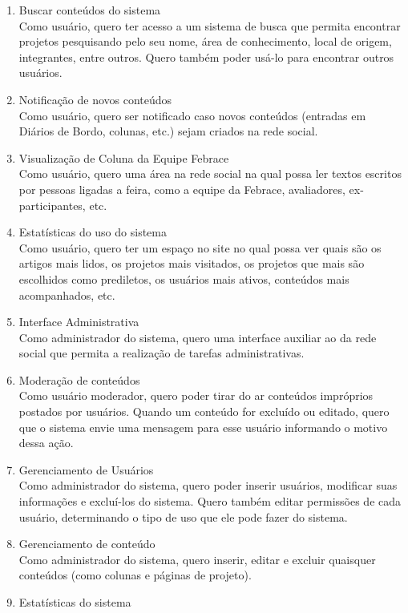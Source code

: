 \begin{enumerate}
      \item Buscar conteúdos do sistema \\
        Como usuário, quero ter acesso a  um sistema de busca que permita encontrar projetos pesquisando pelo seu nome, área de conhecimento, local de origem, integrantes, entre outros. Quero também poder usá-lo para encontrar outros usuários.
      \item Notificação de novos conteúdos \\
        Como usuário, quero ser notificado caso novos conteúdos (entradas em Diários de Bordo, colunas, etc.) sejam criados na rede social.
      \item Visualização de Coluna da Equipe Febrace \\
        Como usuário, quero uma área na rede social na qual possa ler textos escritos por pessoas ligadas a feira, como a equipe da Febrace, avaliadores, ex-participantes, etc.
      \item Estatísticas do uso do sistema \\
        Como usuário, quero ter um espaço no site no qual possa ver quais são os artigos mais lidos, os projetos mais visitados, os projetos que mais são escolhidos como prediletos, os usuários mais ativos, conteúdos mais acompanhados, etc.
      \item Interface Administrativa \\
        Como administrador do sistema, quero uma interface auxiliar ao da rede social que permita a realização de tarefas administrativas.
      \item Moderação de conteúdos \\
        Como usuário moderador, quero poder tirar do ar conteúdos impróprios postados por usuários. Quando um conteúdo for excluído ou editado, quero que o sistema envie uma mensagem para esse usuário informando o motivo dessa ação.
      \item Gerenciamento de Usuários \\
        Como administrador do sistema, quero poder inserir usuários, modificar suas informações e excluí-los do sistema. Quero também editar permissões de cada usuário, determinando o tipo de uso que ele pode fazer do sistema.
      \item Gerenciamento de conteúdo \\
        Como administrador do sistema, quero inserir, editar e excluir quaisquer conteúdos (como colunas e páginas de projeto).
      \item Estatísticas do sistema \\

\end{enumerate}

